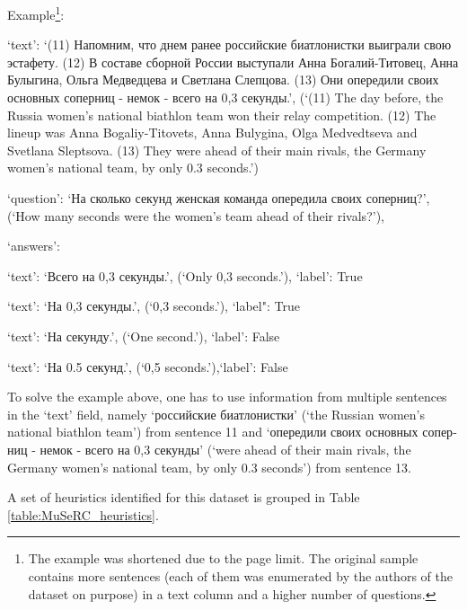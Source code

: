 \documentclass[11pt]{article}
\begin{document}
\begin{flushleft}
Example\footnote{The example was shortened due to the page limit. The original sample contains more sentences (each of them was enumerated by the authors of the dataset on purpose) in a text column and a higher number of questions.}:

`text': \foreignlanguage{russian}{`(11) Напомним, что днем ранее российские биатлонистки выиграли свою эстафету. (12) В составе сборной России выступали Анна Богалий-Титовец, Анна Булыгина, Ольга Медведцева и Светлана Слепцова. (13) Они опередили своих основных соперниц - немок - всего на 0,3 секунды.'}, (`(11) The day before, the Russia women's national biathlon team won their relay competition. (12) The lineup was Anna Bogaliy-Titovets, Anna Bulygina, Olga Medvedtseva and Svetlana Sleptsova. (13) They were ahead of their main rivals, the Germany women's national team, by only 0.3 seconds.') 

`question': \foreignlanguage{russian}{`На сколько секунд женская команда опередила своих соперниц?'}, (`How many seconds were the women's team ahead of their rivals?'),

`answers': 

`text': \foreignlanguage{russian}{`Всего на 0,3 секунды.'}, (`Only 0,3 seconds.'), `label': True
            
`text': \foreignlanguage{russian}{`На 0,3 секунды.'}, (`0,3 seconds.'), `label": True

`text': \foreignlanguage{russian}{`На секунду.'}, (`One second.'), `label': False

`text': \foreignlanguage{russian}{`На 0.5 секунд.'}, (`0,5 seconds.'),`label': False
\end{flushleft}

To solve the example above, one has to use information from multiple sentences in the `text' field, namely \foreignlanguage{russian}{`российские биатлонистки'} (`the Russian women's national biathlon team') from sentence 11 and \foreignlanguage{russian}{`опередили своих основных соперниц - немок - всего на 0,3 секунды'} (`were ahead of their main rivals, the Germany women's national team, by only 0.3 seconds') from sentence 13.

A set of heuristics identified for this dataset is grouped in Table \ref{table:MuSeRC_heuristics}. 
\end{document}
